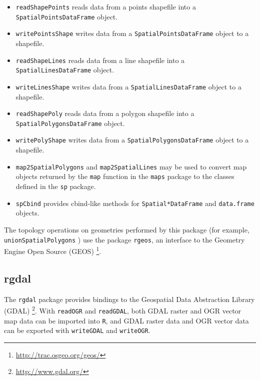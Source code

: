 \documentclass[smallroyalvopaper]{memoir}
\begin{document}
\begin{itemize}
\item \texttt{readShapePoints} reads data from a points shapefile into a \texttt{SpatialPointsDataFrame} object.

\item \texttt{writePointsShape} writes data from a \texttt{SpatialPointsDataFrame} object to a shapefile.

\item \texttt{readShapeLines} reads data from a line shapefile into a \texttt{SpatialLinesDataFrame} object.

\item \texttt{writeLinesShape} writes data from a \texttt{SpatialLinesDataFrame} object to a shapefile.

\item \texttt{readShapePoly} reads data from a polygon shapefile into a \texttt{SpatialPolygonsDataFrame} object.

\item \texttt{writePolyShape} writes data from a \texttt{SpatialPolygonsDataFrame} object to a shapefile.

\item \texttt{map2SpatialPolygons} and \texttt{map2SpatialLines} may be used to convert map objects returned by the \texttt{map} function in the \texttt{maps} package to the classes defined in the \texttt{sp} package.

\item \texttt{spCbind} provides cbind-like methods for \texttt{Spatial*DataFrame} and \texttt{data.frame} objects.
\end{itemize}

The topology operations on geometries performed by this package (for example, \texttt{unionSpatialPolygons} ) use the package \texttt{rgeos}, an interface to the Geometry Engine Open Source (GEOS) \footnote{\url{http://trac.osgeo.org/geos/}}.

\subsection{rgdal}
\label{sec:orgheadline28}
\label{sec:rgdal}

The \texttt{rgdal} package \cite{Bivand.Keitt.ea2013} provides bindings to the Geospatial Data Abstraction Library (GDAL) \footnote{\url{http://www.gdal.org/}}. With \texttt{readOGR} and \texttt{readGDAL}, both GDAL raster and OGR vector map data can be imported into \texttt{R}, and GDAL raster data and OGR vector data can be exported with \texttt{writeGDAL} and \texttt{writeOGR}.
\end{document}
